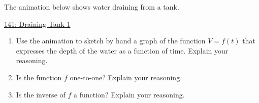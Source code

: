 \documentclass{ximera}
\begin{document}
\begin{exploration} \label{E1:Quadratics}
The animation below shows water draining from a tank. 

\begin{onlineOnly}
    \begin{center}
\end{center}
\end{onlineOnly}

\href{https://www.desmos.com/calculator/pdghky6tie}{141: Draining Tank 1}

\begin{enumerate}
\item Use the animation to sketch by hand a graph of the function $V=f(t)$ that expresses the depth of the water as a function of time. Explain your reasoning.

\item Is the function $f$ one-to-one? Explain your reasoning.

\item Is the inverse of $f$ a function? Explain your reasoning.

\end{enumerate}
\end{exploration}
\end{document}
